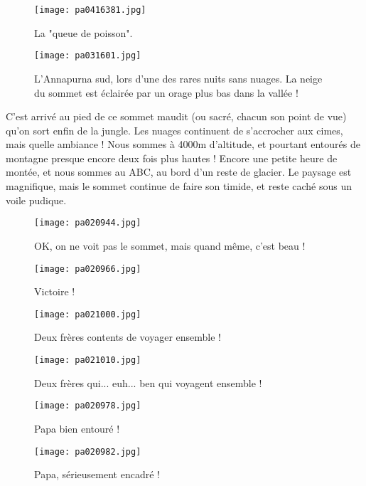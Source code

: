 \documentclass{book}
\begin{document}
\begin{figure}[h]
\centering
\texttt{[image: pa0416381.jpg]}
\caption*{La "queue de poisson".}
\end{figure}


\begin{figure}[h]
\centering
\texttt{[image: pa031601.jpg]}
\caption*{L'Annapurna sud, lors d'une des rares nuits sans nuages. La neige du sommet est éclairée par un orage plus bas dans la vallée !}
\end{figure}

C'est arrivé au pied de ce sommet maudit (ou sacré, chacun son point de vue) qu'on sort enfin de la jungle. Les nuages continuent de s'accrocher aux cimes, mais quelle ambiance ! Nous sommes à 4000m d'altitude, et pourtant entourés de montagne presque encore deux fois plus hautes ! Encore une petite heure de montée, et nous sommes au ABC, au bord d'un reste de glacier. Le paysage est magnifique, mais le sommet continue de faire son timide, et reste caché sous un voile pudique.


\begin{figure}[h]
\centering
\texttt{[image: pa020944.jpg]}
\caption*{OK, on ne voit pas le sommet, mais quand même, c'est beau !}
\end{figure}


\begin{figure}[h]
\centering
\texttt{[image: pa020966.jpg]}
\caption*{Victoire !}
\end{figure}


\begin{figure}[h]
\centering
\texttt{[image: pa021000.jpg]}
\caption*{Deux frères contents de voyager ensemble !}
\end{figure}


\begin{figure}[h]
\centering
\texttt{[image: pa021010.jpg]}
\caption*{Deux frères qui... euh... ben qui voyagent ensemble !}
\end{figure}


\begin{figure}[h]
\centering
\texttt{[image: pa020978.jpg]}
\caption*{Papa bien entouré !}
\end{figure}


\begin{figure}[h]
\centering
\texttt{[image: pa020982.jpg]}
\caption*{Papa, sérieusement encadré !}
\end{figure}
\end{document}
